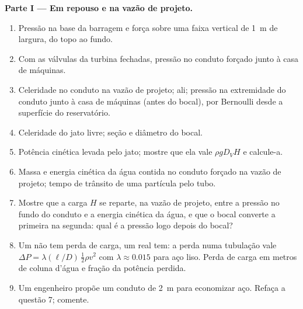 \begin{problem}
\medskip
\noindent\textbf{Parte I --- Em repouso e na vazão de projeto.}
\begin{enumerate}
  \item Pressão na base da barragem e força sobre uma faixa vertical de
        \qty{1}{m} de largura, do topo ao fundo.
  \item Com as válvulas da turbina fechadas, pressão no conduto forçado junto à
        casa de máquinas.
  \item Celeridade no conduto na vazão de projeto;  ali;
        pressão na extremidade do conduto junto à casa de máquinas (antes do
        bocal), por Bernoulli desde a superfície do reservatório.
  \item Celeridade do jato livre; seção e diâmetro do bocal.
  \item Potência cinética levada pelo jato; mostre que ela vale $\rho gD_VH$
        e calcule-a.
  \item Massa e energia cinética da água contida no conduto forçado
        na vazão de projeto; tempo de trânsito de uma partícula pelo tubo.
  \item Mostre que a carga $H$ se reparte, na vazão de projeto, entre a
        pressão no fundo do conduto e a energia cinética
        da água, e que o bocal converte a primeira na
        segunda: qual é a pressão logo depois do bocal?
  \item Um  não tem perda de carga, um real tem: a perda numa
        tubulação vale $\Delta P = \lambda(\ell/D)\,\tfrac12\rho v^2$ com $\lambda
        \approx 0.015$ para aço liso. Perda de carga em metros de coluna d'água e
        fração da potência perdida.
  \item Um engenheiro propõe um conduto de \qty{2}{m} para economizar aço. Refaça
        a questão 7; comente.
\end{enumerate}


\end{problem}
